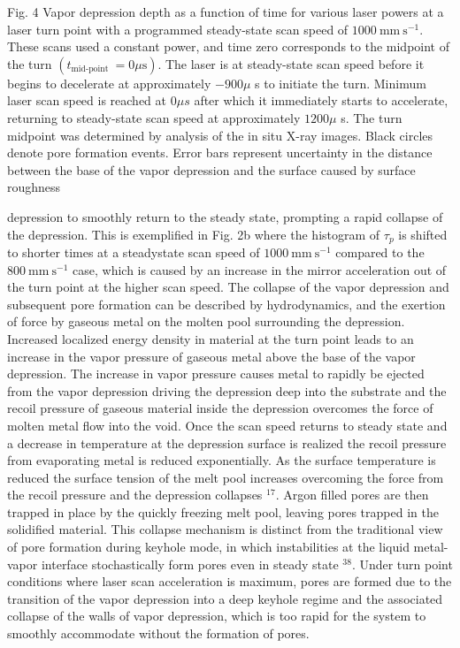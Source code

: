 \documentclass[10pt]{article}
\begin{document}
Fig. 4 Vapor depression depth as a function of time for various laser powers at a laser turn point with a programmed steady-state scan speed of $1000 \mathrm{~mm} \mathrm{~s}^{-1}$. These scans used a constant power, and time zero corresponds to the midpoint of the turn $\left(t_{\text {mid-point }}=0 \mu \mathrm{s}\right)$. The laser is at steady-state scan speed before it begins to decelerate at approximately $-900 \mu$ s to initiate the turn. Minimum laser scan speed is reached at $0 \mu s$ after which it immediately starts to accelerate, returning to steady-state scan speed at approximately $1200 \mu$ s. The turn midpoint was determined by analysis of the in situ X-ray images. Black circles denote pore formation events. Error bars represent uncertainty in the distance between the base of the vapor depression and the surface caused by surface roughness

depression to smoothly return to the steady state, prompting a rapid collapse of the depression. This is exemplified in Fig. 2b where the histogram of $\tau_{p}$ is shifted to shorter times at a steadystate scan speed of $1000 \mathrm{~mm} \mathrm{~s}^{-1}$ compared to the $800 \mathrm{~mm} \mathrm{~s}^{-1}$ case, which is caused by an increase in the mirror acceleration out of the turn point at the higher scan speed. The collapse of the vapor depression and subsequent pore formation can be described by hydrodynamics, and the exertion of force by gaseous metal on the molten pool surrounding the depression. Increased localized energy density in material at the turn point leads to an increase in the vapor pressure of gaseous metal above the base of the vapor depression. The increase in vapor pressure causes metal to rapidly be ejected from the vapor depression driving the depression deep into the substrate and the recoil pressure of gaseous material inside the depression overcomes the force of molten metal flow into the void. Once the scan speed returns to steady state and a decrease in temperature at the depression surface is realized the recoil pressure from evaporating metal is reduced exponentially. As the surface temperature is reduced the surface tension of the melt pool increases overcoming the force from the recoil pressure and the depression collapses ${ }^{17}$. Argon filled pores are then trapped in place by the quickly freezing melt pool, leaving pores trapped in the solidified material. This collapse mechanism is distinct from the traditional view of pore formation during keyhole mode, in which instabilities at the liquid metal-vapor interface stochastically form pores even in steady state ${ }^{38}$. Under turn point conditions where laser scan acceleration is maximum, pores are formed due to the transition of the vapor depression into a deep keyhole regime and the associated collapse of the walls of vapor depression, which is too rapid for the system to smoothly accommodate without the formation of pores.
\end{document}

